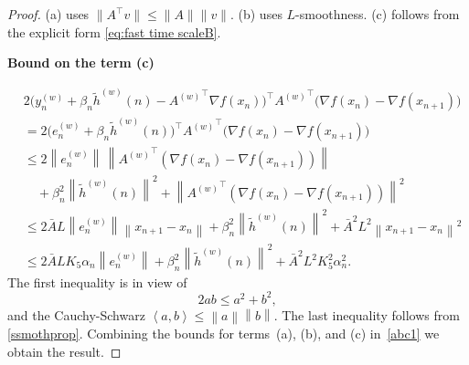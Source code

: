 \documentclass[10pt,a4paper]{amsart}
\newcommand{\inprod}[2]{\left\langle #1, #2 \right\rangle}
\newcommand{\norm}[1]{\left\lVert #1 \right\rVert}
\begin{document}
\begin{proof}
(a) uses $\|A^\top v\|\le \|A\|\|v\|$. 
(b) uses $L$-smoothness. 
(c) follows from the explicit form \eqref{eq:fast time scaleB}.

\textbf{Bound on the term (c)}

\begin{equation*}
\begin{split}
& 2\big(y_n^{(w)} + \beta_n \widetilde{h}^{(w)}(n) - {A^{(w)}}^\top \nabla f(x_n)\big)^\top
{A^{(w)}}^\top\big(\nabla f(x_n) - \nabla f(x_{n+1})\big) \\
&= 2\big(e_n^{(w)} + \beta_n \widetilde{h}^{(w)}(n)\big)^\top
{A^{(w)}}^\top\big(\nabla f(x_n) - \nabla f(x_{n+1})\big) \\
&\le 
2 \norm{e_n^{(w)}} \,
\norm{{A^{(w)}}^\top(\nabla f(x_n)-\nabla f(x_{n+1}))} \\
&\quad +
\beta_n^2 \norm{\widetilde{h}^{(w)}(n)}^2
+ \norm{{A^{(w)}}^\top(\nabla f(x_n)-\nabla f(x_{n+1}))}^2 \\
&\le 
2 \bar{A} L \norm{e_n^{(w)}} \norm{x_{n+1}-x_n}
+ \beta_n^2 \norm{\widetilde{h}^{(w)}(n)}^2
+ \bar{A}^2 L^2 \norm{x_{n+1}-x_n}^2 \\
&\le 
2 \bar{A} L K_5 \alpha_n \norm{e_n^{(w)}}
+ \beta_n^2 \norm{\widetilde{h}^{(w)}(n)}^2
+ \bar{A}^2 L^2 K_5^2 \alpha_n^2.
\end{split}
\end{equation*}
The first inequality is in view of \[ 2 a b  \leq  a^2 + b^2,
\] and the Cauchy-Schwarz $\inprod{a}{b} \leq \norm{a}\norm{b}$. The last inequality follows from \eqref{ssmothprop}. Combining the bounds for terms~(a), (b), and (c) in~\eqref{abc1} we obtain the result. 
\end{proof}
\end{document}
